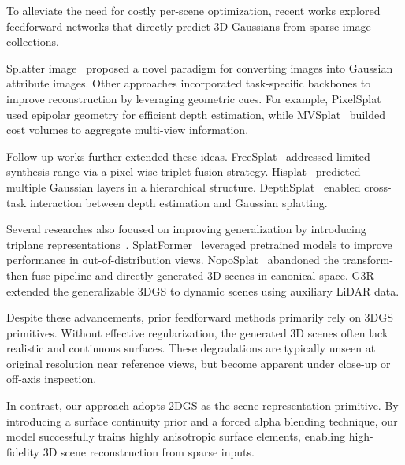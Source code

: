 To alleviate the need for costly per-scene optimization, recent works explored feedforward networks that directly predict 3D Gaussians from sparse image collections.

Splatter image~\cite{szymanowicz2024splatter} proposed a novel paradigm for converting images into Gaussian attribute images. Other approaches incorporated task-specific backbones to improve reconstruction by leveraging geometric cues. For example, PixelSplat~\cite{charatan2024pixelsplat} used epipolar geometry for efficient depth estimation, while MVSplat~\cite{chen2024mvsplat} builded cost volumes to aggregate multi-view information.

Follow-up works further extended these ideas. FreeSplat~\cite{wang2024freesplat} addressed limited synthesis range via a pixel-wise triplet fusion strategy. Hisplat~\cite{tang2024hisplat} predicted multiple Gaussian layers in a hierarchical structure. DepthSplat~\cite{xu2024depthsplat} enabled cross-task interaction between depth estimation and Gaussian splatting.

Several researches also focused on improving generalization by introducing triplane representations~\cite{zou2024triplane,xu2024agg}. SplatFormer~\cite{chen2024splatformer} leveraged pretrained models to improve performance in out-of-distribution views. NopoSplat~\cite{ye2024no} abandoned the transform-then-fuse pipeline and directly generated 3D scenes in canonical space. G3R~\cite{chen2024g3r} extended the generalizable 3DGS to dynamic scenes using auxiliary LiDAR data.

Despite these advancements, prior feedforward methods primarily rely on 3DGS primitives. Without effective regularization, the generated 3D scenes often lack realistic and continuous surfaces. These degradations are typically unseen at original resolution near reference views, but become apparent under close-up or off-axis inspection.

In contrast, our approach adopts 2DGS as the scene representation primitive. By introducing a surface continuity prior and a forced alpha blending technique, our model successfully trains highly anisotropic surface elements, enabling high-fidelity 3D scene reconstruction from sparse inputs.
